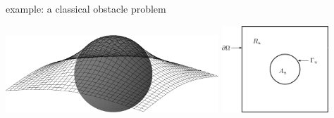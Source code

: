 \documentclass[svgnames,
               hyperref={colorlinks,citecolor=DeepPink4,linkcolor=FireBrick,urlcolor=Maroon},
               usepdftitle=false]  %
               {beamer}
\begin{document}
\begin{frame}{example: a classical obstacle problem}

\includegraphics[width=0.6\textwidth]{images/obstacle65.pdf} \qquad \includegraphics[width=0.3\textwidth]{images/obstacle-sets.png}


\end{frame}
\end{document}

